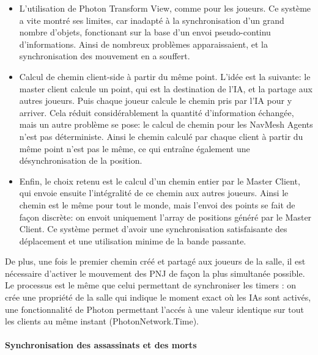             \begin{itemize}
                \item L'utilisation de Photon Transform View, comme pour les joueurs. Ce système a vite montré ses limites, car inadapté à la synchronisation
                d'un grand nombre d'objets, fonctionant sur la base d'un envoi pseudo-continu d'informations. Ainsi de nombreux problèmes apparaissaient,
                et la synchronisation des mouvement en a souffert. 

                \item Calcul de chemin client-side à partir du même point. L'idée est la suivante: le master client calcule un point, qui est la destination
                de l'IA, et la partage aux autres joueurs. Puis chaque joueur calcule le chemin pris par l'IA pour y arriver. Cela réduit considérablement la
                quantité d'information échangée, mais un autre problème se pose: le calcul de chemin pour les NavMesh Agents n'est pas déterministe. Ainsi le
                chemin calculé par chaque client à partir du même point n'est pas le même, ce qui entraîne également une désynchronisation de la position.

                \item Enfin, le choix retenu est le calcul d'un chemin entier par le Master Client, qui envoie ensuite l'intégralité de ce chemin aux autres joueurs.
                Ainsi le chemin est le même pour tout le monde, mais l'envoi des points se fait de façon discrète: on envoit uniquement l'array de positions généré
                par le Master Client. Ce système permet d'avoir une synchronisation satisfaisante des déplacement et une utilisation minime de la bande passante.
            
            \end{itemize}
            
                De plus, une fois le premier chemin créé et partagé aux joueurs de la salle, il est nécessaire d'activer le mouvement des PNJ de façon la plus simultanée possible.
                Le processus est le même que celui permettant de synchroniser les timers : on crée une propriété de la salle qui indique le moment exact où
                les IAs sont activés, une fonctionnalité de Photon permettant l'accés à une valeur identique sur tout les clients au même instant (PhotonNetwork.Time).
    

        \paragraph{Synchronisation des assassinats et des morts}

